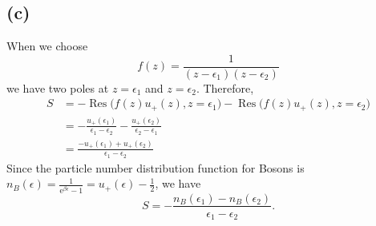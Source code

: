\documentclass{article}
\newcommand{\me}{\mathrm{e}}
\begin{document}
\subsection*{(c)}
When we choose 
\begin{equation}
    f(z)=\frac{1}{(z-\epsilon_1)(z-\epsilon_2)}
\end{equation}
we have two poles at $z=\epsilon_1$ and $z=\epsilon_2$. Therefore,
\begin{equation}
    \begin{split}
        S&=-\operatorname*{Res}\big(f(z)u_+(z), z=\epsilon_1\big)-\operatorname*{Res}\big(f(z)u_+(z), z=\epsilon_2\big)\\
         &=-\frac{u_{+}(\epsilon_1)}{\epsilon_1-\epsilon_2}-\frac{u_{+}(\epsilon_2)}{\epsilon_2-\epsilon_1}\\
         &=\frac{-u_{+}(\epsilon_1)+u_{+}(\epsilon_2)}{\epsilon_1-\epsilon_2}
    \end{split}
\end{equation}
Since the particle number distribution function for Bosons is $n_B(\epsilon) = \frac{1}{\me^{\beta\epsilon}-1} = u_+(\epsilon)-\frac{1}{2}$, we have
\begin{equation}
    S=-\frac{n_B(\epsilon_1)-n_B(\epsilon_2)}{\epsilon_1-\epsilon_2}.
\end{equation}


%
%
\end{document}

